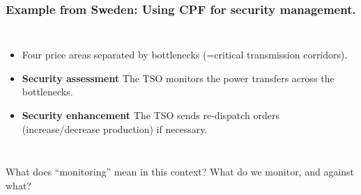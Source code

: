 \documentclass{beamer}
\begin{document}
\begin{frame}
  \frametitle{Example from Sweden: Using CPF for security management.}
  \begin{columns}
    \begin{itemize}
    \item Four price areas separated by bottlenecks (=critical transmission corridors).
    \item \textbf{Security assessment} The TSO monitors the power transfers across the bottlenecks. 
    \item \textbf{Security enhancement} The TSO sends re-dispatch orders (increase/decrease production) if necessary.
    \end{itemize}
  \end{columns}
  \begin{block}{}
What does ``monitoring'' mean in this context? What do we monitor, and against what?
  \end{block}
\end{frame}
\end{document}
